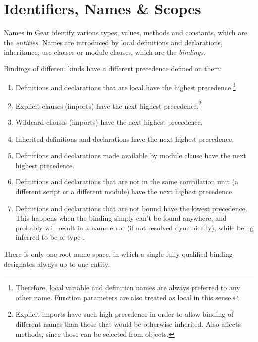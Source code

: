 
\chapter{Identifiers, Names \& Scopes}
\label{sec:identifiers-names-scopes}

Names in Gear identify various types, values, methods and constants, which are the \emph{entities}. Names are introduced by local definitions and declarations, inheritance, use clauses or module clauses, which are the \emph{bindings}. 

Bindings of different kinds have a different precedence defined on them: 

\begin{enumerate}
  \item Definitions and declarations that are local have the highest precedence.\footnote{Therefore, local variable and definition names are always preferred to any other name. Function parameters are also treated as local in this sense.} 
  \item Explicit \lstinline@use@ clauses (imports) have the next highest precedence.\footnote{Explicit imports have such high precedence in order to allow binding of different names than those that would be otherwise inherited. Also affects methods, since those can be selected from objects.} 
  \item Wildcard \lstinline@use@ clauses (imports) have the next highest precedence.
  \item Inherited definitions and declarations have the next highest precedence. 
  \item Definitions and declarations made available by module clause have the next highest precedence. 
  \item Definitions and declarations that are not in the same compilation unit (a different script or a different module) have the next highest precedence. 
  \item Definitions and declarations that are not bound have the lowest precedence. This happens when the binding simply can't be found anywhere, and probably will result in a name error (if not resolved dynamically), while being inferred to be of type \lstinline@Object@. 
\end{enumerate}

There is only one root name space, in which a single fully-qualified binding designates always up to one entity. 

